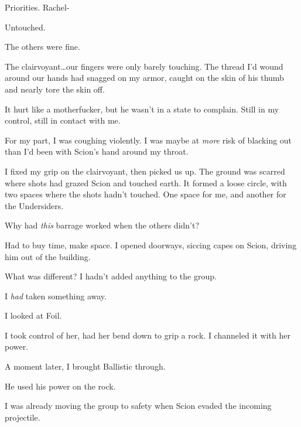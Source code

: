 Priorities.  Rachel-



Untouched.



The others were fine.



The clairvoyant\ldots our fingers were only barely touching.  The thread I'd wound around our hands had snagged on my armor, caught on the skin of his thumb and nearly tore the skin off.



It hurt like a motherfucker, but he wasn't in a state to complain.  Still in my control, still in contact with me.



For my part, I was coughing violently.  I was maybe at \emph{more} risk of blacking out than I'd been with Scion's hand around my throat.



I fixed my grip on the clairvoyant, then picked us up.  The ground was scarred where shots had grazed Scion and touched earth.  It formed a loose circle, with two spaces where the shots hadn't touched.  One space for me, and another for the Undersiders.



Why had \emph{this} barrage worked when the others didn't?



Had to buy time, make space.  I opened doorways, siccing capes on Scion, driving him out of the building.



What was different?  I hadn't added anything to the group.



I \emph{had} taken something away.



I looked at Foil.



I took control of her, had her bend down to grip a rock.  I channeled it with her power.



A moment later, I brought Ballistic through.



He used his power on the rock.



I was already moving the group to safety when Scion evaded the incoming projectile.



